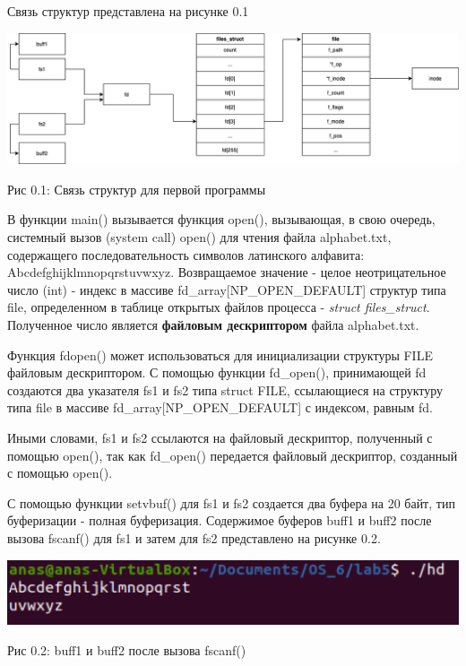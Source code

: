 \documentclass[12pt]{report}
\begin{document}
Связь структур представлена на рисунке 0.1

\begin{center}
		\includegraphics[scale=0.45]{pics/proc1.png}
		
			Рис 0.1: Связь структур для первой программы
\end{center}

В функции main() вызывается функция open(), вызывающая, в свою очередь, системный вызов (system call) open() для чтения файла alphabet.txt,  содержащего последовательность символов латинского алфавита: Abcdefghijklmnopqrstuvwxyz. Возвращаемое значение - целое неотрицательное число (int) - индекс в массиве fd\_array[NP\_OPEN\_DEFAULT] структур типа file, определенном в таблице открытых файлов процесса - \textit{struct files\_struct}. Полученное число является \textbf{файловым дескриптором} файла alphabet.txt.

Функция fdopen() может использоваться для инициализации структуры FILE файловым дескриптором.
С помощью функции fd\_open(), принимающей fd создаются два указателя fs1 и fs2 типа struct FILE, ссылающиеся на структуру типа file в массиве fd\_array[NP\_OPEN\_DEFAULT] с индексом, равным fd. 

Иными словами, fs1 и fs2 ссылаются на файловый дескриптор, полученный с помощью open(), так как fd\_open() передается файловый дескриптор, созданный с помощью open().

С помощью функции setvbuf() для fs1 и fs2 создается два буфера на 20 байт, тип буферизации - полная буферизация. Содержимое буферов buff1 и buff2 после вызова fscanf() для fs1 и затем для fs2 представлено на рисунке 0.2.

\begin{center}
		\includegraphics[scale=0.6]{pics/buff.png}
		
			Рис 0.2: buff1 и buff2 после вызова fscanf()
\end{center}
\end{document}
